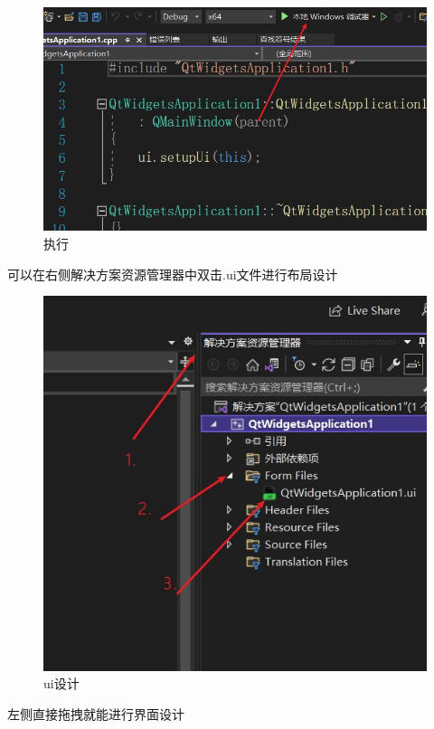 \documentclass[cs4size,a4paper]{ctexart}
\numberwithin{equation}{section}
\numberwithin{table}{section}
\numberwithin{figure}{section}
\begin{document}
\begin{figure}[H]
\small
\centering
\includegraphics[width=\textwidth]{执行.jpg}
\caption{执行} \label{fig:执行}
\end{figure}

可以在右侧\colorbox{LetMeFlyGray}{解决方案资源管理器}中双击\colorbox{LetMeFlyGray}{.ui文件}进行布局设计

\begin{figure}[H]
\small
\centering
\includegraphics[width=\textwidth]{ui设计.jpg}
\caption{ui设计} \label{fig:ui设计}
\end{figure}

左侧直接拖拽就能进行界面设计
\end{document}
